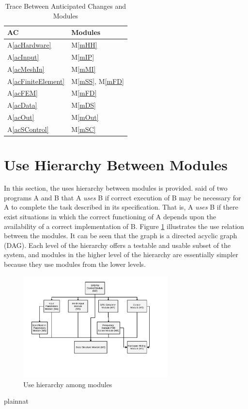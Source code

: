 \documentclass[12pt, titlepage]{article}
\begin{document}
\begin{table}[H]
\centering
\begin{tabular}{p{} p{}}
\toprule
\textbf{AC} & \textbf{Modules}\\
\midrule
A\ref{acHardware} & M\ref{mHH}\\
A\ref{acInput} & M\ref{mIP}\\
A\ref{acMeshIn} & M\ref{mMI}\\
A\ref{acFiniteElement} & M\ref{mSS}, M\ref{mFD}\\
A\ref{acFEM} & M\ref{mFD}\\
A\ref{acData} & M\ref{mDS}\\
A\ref{acOut} & M\ref{mOut}\\
A\ref{acSControl} & M\ref{mSC}\\
\bottomrule
\end{tabular}
\caption{Trace Between Anticipated Changes and Modules}
\label{TblACT}
\end{table}

\section{Use Hierarchy Between Modules} \label{SecUse}

In this section, the uses hierarchy between modules is
provided. \citet{Parnas1978} said of two programs A and B that A {\em uses} B if
correct execution of B may be necessary for A to complete the task described in
its specification. That is, A {\em uses} B if there exist situations in which
the correct functioning of A depends upon the availability of a correct
implementation of B.  Figure \ref{FigUH} illustrates the use relation between
the modules. It can be seen that the graph is a directed acyclic graph
(DAG). Each level of the hierarchy offers a testable and usable subset of the
system, and modules in the higher level of the hierarchy are essentially simpler
because they use modules from the lower levels.

\begin{figure}[H]
\centering
\includegraphics[width=0.7\textwidth]{MG-Chart.pdf}
\caption{Use hierarchy among modules}
\label{FigUH}
\end{figure}


 {plainnat}

\end{document}
